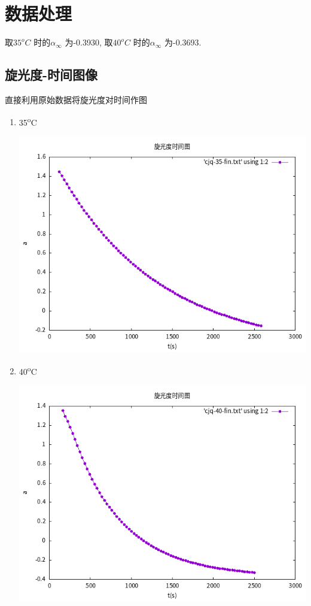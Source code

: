 \documentclass[11pt]{report}
\begin{document}
\chapter{数据处理}
\label{sec:org0ddd398}
取\(35^{o}C\) 时的\(\alpha_{\infty}\) 为-0.3930,
取\(40^{o}C\) 时的\(\alpha_{\infty}\) 为-0.3693.
\section{旋光度-时间图像}
\label{sec:orge0804ec}
直接利用原始数据将旋光度对时间作图
\begin{enumerate}
\item 35\textsuperscript{o}C
\label{sec:org0280c4d}
\begin{center}
\includegraphics[width=.9\linewidth]{../data/cjq-35.png}
\end{center}
\item 40\textsuperscript{o}C
\label{sec:orgf32cae2}
\begin{center}
\includegraphics[width=.9\linewidth]{../data/cjq-40.png}
\end{center}
\end{enumerate}
\end{document}
